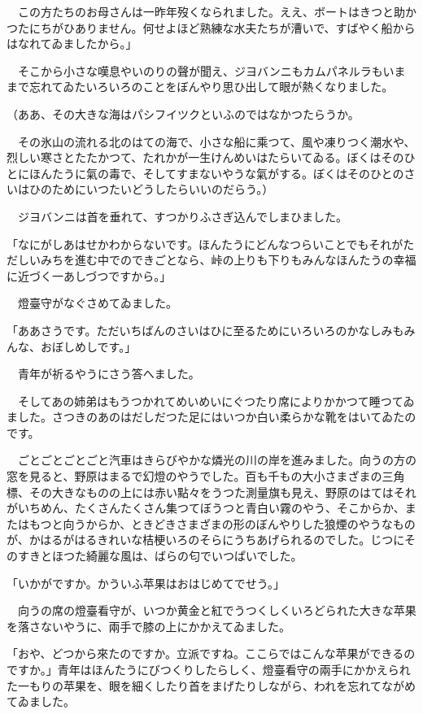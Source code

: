 \documentclass[tate,paper=b6j,jafontsize=9pt]{jlreq}
\begin{document}
　この方たちのお母さんは一昨年歿くなられました。ええ、ボートはきつと助かつたにちがひありません。何せよほど熟練な水夫たちが漕いで、すばやく船からはなれてゐましたから。」

　そこから小さな嘆息やいのりの聲が聞え、ジヨバンニもカムパネルラもいままで忘れてゐたいろいろのことをぼんやり思ひ出して眼が熱くなりました。

（ああ、その大きな海はパシフイツクといふのではなかつたらうか。

　その氷山の流れる北のはての海で、小さな船に乘つて、風や凍りつく潮水や、烈しい寒さとたたかつて、たれかが一生けんめいはたらいてゐる。ぼくはそのひとにほんたうに氣の毒で、そしてすまないやうな氣がする。ぼくはそのひとのさいはひのためにいつたいどうしたらいいのだらう。）

　ジヨバンニは首を垂れて、すつかりふさぎ込んでしまひました。

「なにがしあはせかわからないです。ほんたうにどんなつらいことでもそれがただしいみちを進む中でのできごとなら、峠の上りも下りもみんなほんたうの幸福に近づく一あしづつですから。」

　燈臺守がなぐさめてゐました。

「ああさうです。ただいちばんのさいはひに至るためにいろいろのかなしみもみんな、おぼしめしです。」

　青年が祈るやうにさう答へました。

　そしてあの姉弟はもうつかれてめいめいにぐつたり席によりかかつて睡つてゐました。さつきのあのはだしだつた足にはいつか白い柔らかな靴をはいてゐたのです。

　ごとごとごとごと汽車はきらびやかな燐光の川の岸を進みました。向うの方の窓を見ると、野原はまるで幻燈のやうでした。百も千もの大小さまざまの三角標、その大きなものの上には赤い點々をうつた測量旗も見え、野原のはてはそれがいちめん、たくさんたくさん集つてぼうつと青白い霧のやう、そこからか、またはもつと向うからか、ときどきさまざまの形のぼんやりした狼煙のやうなものが、かはるがはるきれいな桔梗いろのそらにうちあげられるのでした。じつにそのすきとほつた綺麗な風は、ばらの匂でいつぱいでした。

「いかがですか。かういふ苹果はおはじめてでせう。」

　向うの席の燈臺看守が、いつか黄金と紅でうつくしくいろどられた大きな苹果を落さないやうに、兩手で膝の上にかかえてゐました。

「おや、どつから來たのですか。立派ですね。ここらではこんな苹果ができるのですか。」青年はほんたうにびつくりしたらしく、燈臺看守の兩手にかかえられた一もりの苹果を、眼を細くしたり首をまげたりしながら、われを忘れてながめてゐました。
\end{document}
